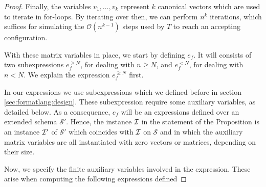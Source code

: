 \begin{proof}
    Finally, the variables $v_1,\ldots,v_{k}$ represent $k$ canonical vectors  which are used to iterate 
    in for-loops. By iterating over then, we can perform $n^{k}$ iterations, 
    which suffices for simulating the $\mathcal{O}(n^{k-1})$ steps used by $T$ to reach an accepting configuration.


    With these matrix variables in place, we start by defining $e_f$. It will consists of two subexpressions
    $e_f^{\geq N}$, for dealing with $n\geq N$, and $e_f^{<N}$, for dealing with $n<N$. We explain the expression
    $e_f^{\geq N}$ first.



    In our  expressions we use subexpressions which we defined before in section \ref{sec:formatlang:design}. These subexpression 
    require some auxiliary variables, as detailed below. As a consequence, $e_f$ will be an expressions 
    defined over an extended schema $\mathcal{S}'$. Hence, the instance $\mathcal{I}$ in the statement of the Proposition 
    is  an instance $\mathcal{I}'$ of $\mathcal{S}'$ which
    coincides with $\mathcal{I}$ on $\mathcal{S}$ and in which the auxiliary matrix variables are all instantiated with 
    zero vectors or matrices, depending on their size.

    Now, we specify the finite auxiliary variables involved in the \langfor expression. These arise
    when computing the following \langfor expressions defined 


\end{proof}
